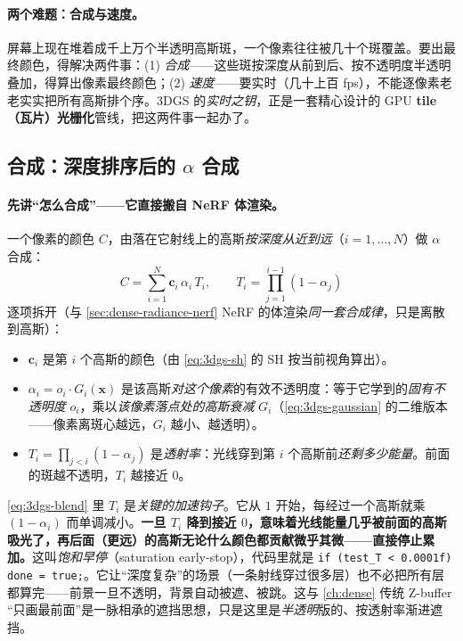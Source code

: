 \paragraph{两个难题：合成与速度。}
屏幕上现在堆着成千上万个半透明高斯斑，一个像素往往被几十个斑覆盖。要出最终颜色，得解决两件事：(1) \emph{合成}——这些斑按深度从前到后、按不透明度半透明叠加，得算出像素最终颜色；(2) \emph{速度}——要实时（几十上百 fps），不能逐像素老老实实把所有高斯排个序。3DGS 的\emph{实时之钥}，正是一套精心设计的 GPU \textbf{tile（瓦片）光栅化}管线，把这两件事一起办了。

\subsection{合成：深度排序后的 $\alpha$ 合成}

\paragraph{先讲“怎么合成”——它直接搬自 NeRF 体渲染。}
一个像素的颜色 $C$，由落在它射线上的高斯\emph{按深度从近到远}（$i=1,\dots,N$）做 $\alpha$ 合成：
\begin{equation}
  \boxed{\;C=\sum_{i=1}^{N}\mathbf c_i\,\alpha_i\,T_i,\qquad T_i=\prod_{j=1}^{i-1}(1-\alpha_j)\;}
  \label{eq:3dgs-blend}
\end{equation}
逐项拆开（与 \cref{sec:dense-radiance-nerf} NeRF 的体渲染\emph{同一套合成律}，只是离散到高斯）：
\begin{itemize}
  \item $\mathbf c_i$ 是第 $i$ 个高斯的颜色（由 \cref{eq:3dgs-sh} 的 SH 按当前视角算出）。
  \item $\alpha_i=o_i\cdot G_i(\mathbf x)$ 是该高斯\emph{对这个像素}的有效不透明度：等于它学到的\emph{固有不透明度} $o_i$，乘以\emph{该像素落点处的高斯衰减} $G_i$（\cref{eq:3dgs-gaussian} 的二维版本——像素离斑心越远，$G_i$ 越小、越透明）。
  \item $T_i=\prod_{j<i}(1-\alpha_j)$ 是\emph{透射率}：光线穿到第 $i$ 个高斯前\emph{还剩多少能量}。前面的斑越不透明，$T_i$ 越接近 $0$。
\end{itemize}

\begin{insight}
\cref{eq:3dgs-blend} 里 $T_i$ 是\emph{关键的加速钩子}。它从 $1$ 开始，每经过一个高斯就乘 $(1-\alpha_i)$ 而单调减小。\textbf{一旦 $T_i$ 降到接近 $0$，意味着光线能量几乎被前面的高斯吸光了，再后面（更远）的高斯无论什么颜色都贡献微乎其微——直接停止累加。}这叫\emph{饱和早停}（saturation early-stop），代码里就是 \texttt{if (test\_T < 0.0001f) done = true;}。它让“深度复杂”的场景（一条射线穿过很多层）也不必把所有层都算完——前景一旦不透明，背景自动被遮、被跳。这与 \cref{ch:dense} 传统 Z-buffer “只画最前面”是一脉相承的遮挡思想，只是这里是\emph{半透明}版的、按透射率渐进遮挡。
\end{insight}

